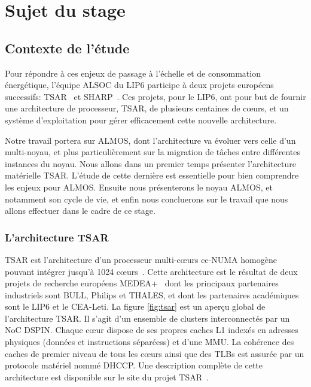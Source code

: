 \chapter{Sujet du stage}
\label{chap:subject}

  \section{Contexte de l'étude}

    Pour répondre à ces enjeux de passage à l'échelle et de consommation
    énergétique, l'équipe ALSOC du LIP6 participe à deux projets européens
    successifs: TSAR~\cite{tsar2008} et SHARP~\cite{sharp2012}. Ces projets,
    pour le LIP6, ont pour but de fournir une architecture de processeur, TSAR,
    de plusieurs centaines de c\oe urs, et un système d'exploitation pour gérer
    efficacement cette nouvelle architecture.

    Notre travail portera sur ALMOS, dont l'architecture va évoluer vers celle
    d'un multi-noyau, et plus particulièrement sur la migration de tâches entre
    différentes instances du noyau. Nous allons dans un premier temps présenter
    l'architecture matérielle TSAR. L'étude de cette dernière est essentielle
    pour bien comprendre les enjeux pour ALMOS. Ensuite nous présenterons le
    noyau ALMOS, et notamment son cycle de vie, et enfin nous concluerons sur le
    travail que nous allons effectuer dans le cadre de ce stage.
  

    \subsection{L'architecture TSAR}
    \label{sec:tsar}

      TSAR est l'architecture d’un processeur multi-c\oe urs cc-NUMA homogène
      pouvant intégrer jusqu’à 1024 c\oe urs~\cite{greiner2009tsar}. Cette
      architecture est le résultat de deux projets de recherche européens
      MEDEA+~\cite{tsar2008,sharp2012} dont les principaux partenaires
      industriels sont BULL, Philips et THALES, et dont les partenaires
      académiques sont le LIP6 et le CEA-Leti. La figure \ref{fig:tsar} est un
      aperçu global de l'architecture TSAR. Il s'agit d'un ensemble de clusters
      interconnectés par un NoC DSPIN. Chaque c\oe ur dispose de ses propres
      caches L1 indexés en adresses physiques (données et instructions
      séparéess) et d'une MMU. La cohérence des caches de premier niveau de tous
      les c\oe urs ainsi que des TLBs est assurée par un protocole matériel
      nommé DHCCP. Une description complète de cette architecture est disponible
      sur le site du projet TSAR~\cite{tsar2008web}.

